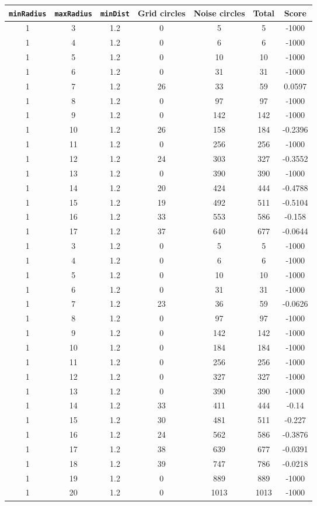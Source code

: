 \documentclass[letterpaper, 12pt]{article}
\begin{document}
\begin{longtable}{|c|c|c|c|c|c|c|}
\hline
\textbf{\texttt{minRadius}} & \textbf{\texttt{maxRadius}} & \textbf{\texttt{minDist}} & \textbf{Grid circles} & \textbf{Noise circles} & \textbf{Total} & \textbf{Score} \\
\hline
1 & 3 & 1.2 & 0 & 5 & 5 & -1000 \\
\hline
1 & 4 & 1.2 & 0 & 6 & 6 & -1000 \\
\hline
1 & 5 & 1.2 & 0 & 10 & 10 & -1000 \\
\hline
1 & 6 & 1.2 & 0 & 31 & 31 & -1000 \\
\hline
1 & 7 & 1.2 & 26 & 33 & 59 & 0.0597 \\
\hline
1 & 8 & 1.2 & 0 & 97 & 97 & -1000 \\
\hline
1 & 9 & 1.2 & 0 & 142 & 142 & -1000 \\
\hline
1 & 10 & 1.2 & 26 & 158 & 184 & -0.2396 \\
\hline
1 & 11 & 1.2 & 0 & 256 & 256 & -1000 \\
\hline
1 & 12 & 1.2 & 24 & 303 & 327 & -0.3552 \\
\hline
1 & 13 & 1.2 & 0 & 390 & 390 & -1000 \\
\hline
1 & 14 & 1.2 & 20 & 424 & 444 & -0.4788 \\
\hline
1 & 15 & 1.2 & 19 & 492 & 511 & -0.5104 \\
\hline
1 & 16 & 1.2 & 33 & 553 & 586 & -0.158 \\
\hline
1 & 17 & 1.2 & 37 & 640 & 677 & -0.0644 \\
\hline
1 & 3 & 1.2 & 0 & 5 & 5 & -1000 \\
\hline
1 & 4 & 1.2 & 0 & 6 & 6 & -1000 \\
\hline
1 & 5 & 1.2 & 0 & 10 & 10 & -1000 \\
\hline
1 & 6 & 1.2 & 0 & 31 & 31 & -1000 \\
\hline
1 & 7 & 1.2 & 23 & 36 & 59 & -0.0626 \\
\hline
1 & 8 & 1.2 & 0 & 97 & 97 & -1000 \\
\hline
1 & 9 & 1.2 & 0 & 142 & 142 & -1000 \\
\hline
1 & 10 & 1.2 & 0 & 184 & 184 & -1000 \\
\hline
1 & 11 & 1.2 & 0 & 256 & 256 & -1000 \\
\hline
1 & 12 & 1.2 & 0 & 327 & 327 & -1000 \\
\hline
1 & 13 & 1.2 & 0 & 390 & 390 & -1000 \\
\hline
1 & 14 & 1.2 & 33 & 411 & 444 & -0.14 \\
\hline
1 & 15 & 1.2 & 30 & 481 & 511 & -0.227 \\
\hline
1 & 16 & 1.2 & 24 & 562 & 586 & -0.3876 \\
\hline
1 & 17 & 1.2 & 38 & 639 & 677 & -0.0391 \\
\hline
1 & 18 & 1.2 & 39 & 747 & 786 & -0.0218 \\
\hline
1 & 19 & 1.2 & 0 & 889 & 889 & -1000 \\
\hline
1 & 20 & 1.2 & 0 & 1013 & 1013 & -1000 \\
\hline
\end{longtable}
\end{document}
